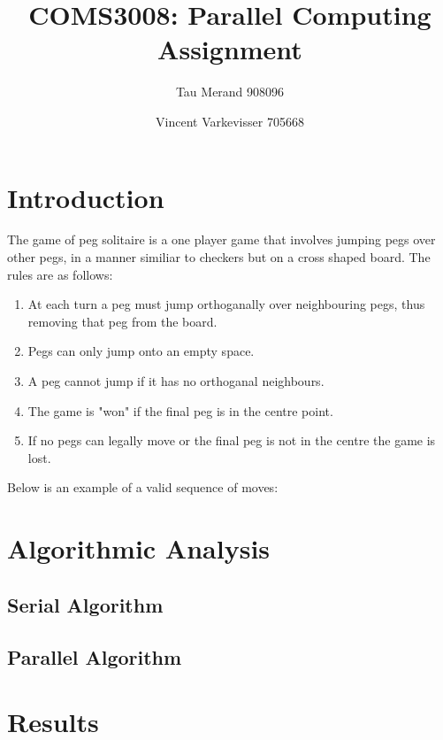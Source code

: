 \documentclass[12pt,a4paper]{report}
\begin{document}
\parindent0pt

\title{COMS3008: Parallel Computing Assignment}
\author{Tau Merand 908096 \and Vincent Varkevisser 705668}
\maketitle
\section{Introduction}
The game of peg solitaire is a one player game that involves jumping pegs over other pegs, in a manner similiar to checkers but on a cross shaped board. The rules are as follows:
\begin{enumerate}
  \item At each turn a peg must jump orthoganally over neighbouring pegs, thus removing that peg from the board.
  \item Pegs can only jump onto an empty space.
  \item A peg cannot jump if it has no orthoganal neighbours.
  \item The game is "won" if the final peg is in the centre point.
  \item If no pegs can legally move or the final peg is not in the centre the game is lost.
\end{enumerate}
Below is an example of a valid sequence of moves:

\section{Algorithmic Analysis}
\subsection{Serial Algorithm}
\subsection{Parallel Algorithm}

\section{Results}
\end{document}
